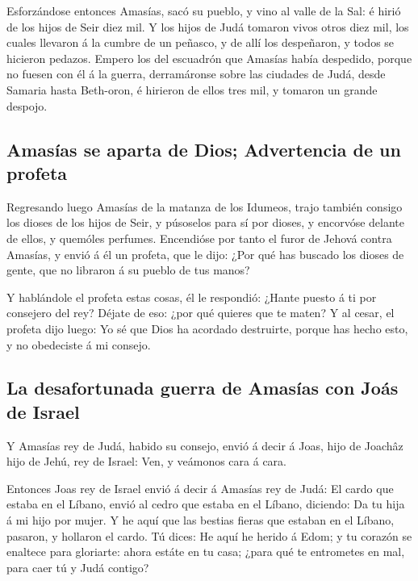  Esforzándose entonces Amasías, sacó su pueblo, y vino al
valle de la Sal: é hirió de los hijos de Seir diez mil.  Y
los hijos de Judá tomaron vivos otros diez mil, los cuales llevaron á la
cumbre de un peñasco, y de allí los despeñaron, y todos se hicieron
pedazos.  Empero los del escuadrón que Amasías había
despedido, porque no fuesen con él á la guerra, derramáronse sobre las
ciudades de Judá, desde Samaria hasta Beth-oron, é hirieron de ellos
tres mil, y tomaron un grande despojo.

\hypertarget{amasuxedas-se-aparta-de-dios-advertencia-de-un-profeta}{%
\subsection{Amasías se aparta de Dios; Advertencia de un
profeta}\label{amasuxedas-se-aparta-de-dios-advertencia-de-un-profeta}}

 Regresando luego Amasías de la matanza de los Idumeos,
trajo también consigo los dioses de los hijos de Seir, y púsoselos para
sí por dioses, y encorvóse delante de ellos, y quemóles perfumes.
 Encendióse por tanto el furor de Jehová contra Amasías, y
envió á él un profeta, que le dijo: ¿Por qué has buscado los dioses de
gente, que no libraron á su pueblo de tus manos?

 Y hablándole el profeta estas cosas, él le respondió:
¿Hante puesto á ti por consejero del rey? Déjate de eso: ¿por qué
quieres que te maten? Y al cesar, el profeta dijo luego: Yo sé que Dios
ha acordado destruirte, porque has hecho esto, y no obedeciste á mi
consejo.

\hypertarget{la-desafortunada-guerra-de-amasuxedas-con-jouxe1s-de-israel}{%
\subsection{La desafortunada guerra de Amasías con Joás de
Israel}\label{la-desafortunada-guerra-de-amasuxedas-con-jouxe1s-de-israel}}

 Y Amasías rey de Judá, habido su consejo, envió á decir á
Joas, hijo de Joachâz hijo de Jehú, rey de Israel: Ven, y veámonos cara
á cara.

 Entonces Joas rey de Israel envió á decir á Amasías rey de
Judá: El cardo que estaba en el Líbano, envió al cedro que estaba en el
Líbano, diciendo: Da tu hija á mi hijo por mujer. Y he aquí que las
bestias fieras que estaban en el Líbano, pasaron, y hollaron el cardo.
 Tú dices: He aquí he herido á Edom; y tu corazón se
enaltece para gloriarte: ahora estáte en tu casa; ¿para qué te
entrometes en mal, para caer tú y Judá contigo?

